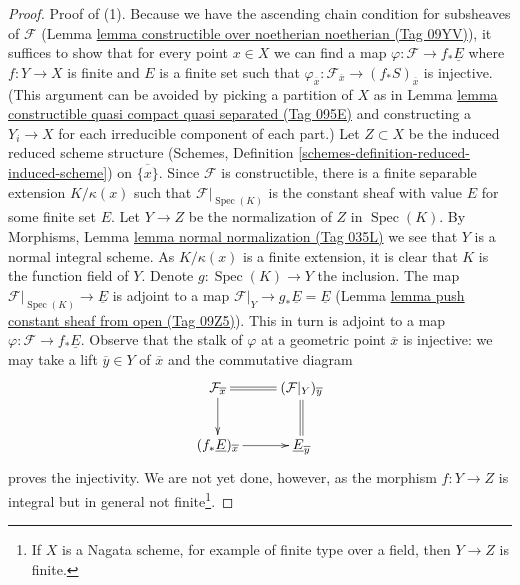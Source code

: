 \documentclass{amsart}
\theoremstyle{plain}
\theoremstyle{definition}
\theoremstyle{remark}
\numberwithin{equation}{subsection}
\def\Spec{\mathop{\mathrm{Spec}}}
\begin{document}
\begin{proof}
Proof of (1). Because we have the ascending chain condition for
subsheaves of $\mathcal{F}$
(Lemma \href{https://stacks.math.columbia.edu/tag/09YV}{lemma constructible over noetherian noetherian (Tag 09YV)}), it
suffices to show that for every point $x \in X$ we
can find a map $\varphi : \mathcal{F} \to f_*\underline{E}$ where
$f : Y \to X$ is finite and $E$ is a finite set such that
$\varphi_{\overline{x}} : \mathcal{F}_{\overline{x}} \to
(f_*S)_{\overline{x}}$ is injective.
(This argument can be avoided by picking a partition of $X$ as in
Lemma \href{https://stacks.math.columbia.edu/tag/095E}{lemma constructible quasi compact quasi separated (Tag 095E)}
and constructing a $Y_i \to X$ for each irreducible component
of each part.)
Let $Z \subset X$ be the induced reduced scheme structure
(Schemes, Definition \ref{schemes-definition-reduced-induced-scheme})
on $\overline{\{x\}}$.
Since $\mathcal{F}$ is constructible, there is a finite separable
extension $K/\kappa(x)$ such that
$\mathcal{F}|_{\Spec(K)}$ is the constant sheaf with value $E$
for some finite set $E$. Let $Y \to Z$ be the normalization
of $Z$ in $\Spec(K)$.
By Morphisms, Lemma \href{https://stacks.math.columbia.edu/tag/035L}{lemma normal normalization (Tag 035L)}
we see that $Y$ is a normal integral scheme.
As $K/\kappa(x)$ is a finite extension, it is clear that $K$ is the function
field of $Y$. Denote $g : \Spec(K) \to Y$ the inclusion.
The map $\mathcal{F}|_{\Spec(K)} \to \underline{E}$ is adjoint
to a map $\mathcal{F}|_Y \to g_*\underline{E} = \underline{E}$
(Lemma \href{https://stacks.math.columbia.edu/tag/09Z5}{lemma push constant sheaf from open (Tag 09Z5)}).
This in turn is adjoint to a map
$\varphi : \mathcal{F} \to f_*\underline{E}$.
Observe that the stalk of $\varphi$ at a geometric point
$\overline{x}$ is injective: we may take a lift $\overline{y} \in Y$
of $\overline{x}$ and the commutative diagram
$$
\xymatrix{
\mathcal{F}_{\overline{x}} \ar@{=}[r] \ar[d] &
(\mathcal{F}|_Y)_{\overline{y}} \ar@{=}[d] \\
(f_*\underline{E})_{\overline{x}} \ar[r] &
\underline{E}_{\overline{y}}
}
$$
proves the injectivity. We are not yet done, however, as the
morphism $f : Y \to Z$ is integral but in general not
finite\footnote{If $X$ is a Nagata scheme, for example of finite
type over a field, then $Y \to Z$ is finite.}.


\end{proof}
\end{document}
